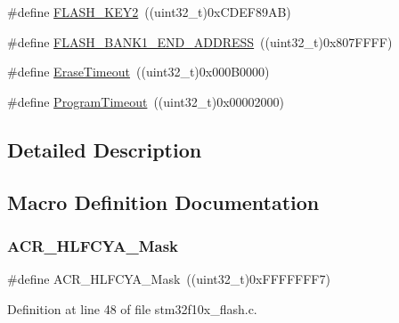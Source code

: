 \begin{DoxyCompactItemize}
\#define \hyperlink{group___f_l_a_s_h___private___defines_gaee83d0f557e158da52f4a205db6b60a7}{F\+L\+A\+S\+H\+\_\+\+K\+E\+Y2}~((uint32\+\_\+t)0x\+C\+D\+E\+F89\+A\+B)
\item 
\#define \hyperlink{group___f_l_a_s_h___private___defines_ga54cf78f1be63ba209709bf8f781ccd01}{F\+L\+A\+S\+H\+\_\+\+B\+A\+N\+K1\+\_\+\+E\+N\+D\+\_\+\+A\+D\+D\+R\+E\+SS}~((uint32\+\_\+t)0x807\+F\+F\+F\+F)
\item 
\#define \hyperlink{group___f_l_a_s_h___private___defines_ga62b5515e9a29a487adcc30a88d082244}{Erase\+Timeout}~((uint32\+\_\+t)0x000\+B0000)
\item 
\#define \hyperlink{group___f_l_a_s_h___private___defines_ga0794a43966b6084d28d13c651c739385}{Program\+Timeout}~((uint32\+\_\+t)0x00002000)
\end{DoxyCompactItemize}


\subsection{Detailed Description}


\subsection{Macro Definition Documentation}
\mbox{\label{group___f_l_a_s_h___private___defines_ga6b6f73163f3a90f5072b6b7dc9fb63b7}} 
\subsubsection{\texorpdfstring{A\+C\+R\+\_\+\+H\+L\+F\+C\+Y\+A\+\_\+\+Mask}{ACR\_HLFCYA\_Mask}}
{\footnotesize\ttfamily \#define A\+C\+R\+\_\+\+H\+L\+F\+C\+Y\+A\+\_\+\+Mask~((uint32\+\_\+t)0x\+F\+F\+F\+F\+F\+F\+F7)}



Definition at line 48 of file stm32f10x\+\_\+flash.\+c.

\mbox{\label{group___f_l_a_s_h___private___defines_ga5f1112c5731f01b063fdf2461efbedf7}} 
